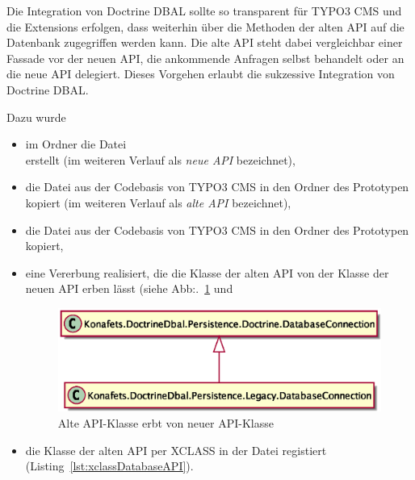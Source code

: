 Die Integration von Doctrine DBAL sollte so transparent für TYPO3 CMS und die Extensions erfolgen, dass weiterhin über die Methoden der alten API auf die Datenbank zugegriffen werden kann. Die alte API steht dabei vergleichbar einer Fassade vor der neuen API, die ankommende Anfragen selbst behandelt oder an die neue API delegiert. Dieses Vorgehen erlaubt die sukzessive Integration von Doctrine DBAL.

Dazu wurde

\begin{itemize}
	\item im Ordner  die Datei\\  erstellt (im weiteren Verlauf als \textit{neue API} bezeichnet),
	\item die Datei  aus der Codebasis von TYPO3 CMS in den Ordner  des Prototypen kopiert (im weiteren Verlauf als \textit{alte API} bezeichnet),
	\item die Datei  aus der Codebasis von TYPO3 CMS in den Ordner  des Prototypen kopiert,
	\item eine Vererbung realisiert, die die Klasse der alten API von der Klasse der neuen API erben lässt (siehe Abb:.~\ref{fig:oldAPIextendsNewAPI} und
\begin{figure}[H]
    \centering
    \includegraphics[scale=0.5]{gfx/uml/NewAPI/OldDatabaseConnectionExtentsFromNewAPI.eps}
    \caption{Alte API-Klasse erbt von neuer API-Klasse}
    \label{fig:oldAPIextendsNewAPI}
\end{figure}
	\item die Klasse der alten API per XCLASS in der Datei  registiert (Listing~\ref{lst:xclassDatabaseAPI}).
\end{itemize}


